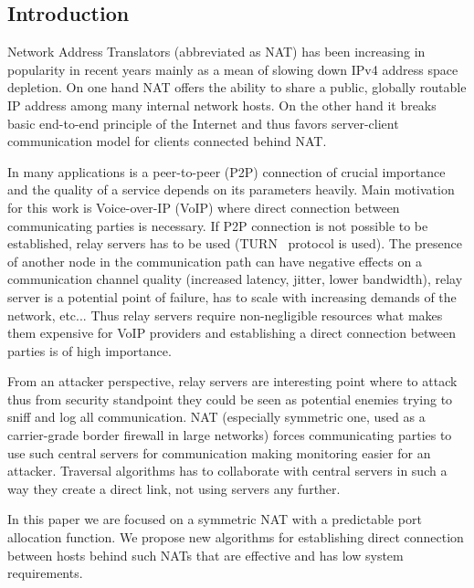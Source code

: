 \documentclass[twoside]{article}
\begin{document}
\begin{multicols}{2}

\section{Introduction}
Network Address Translators (abbreviated as NAT) has been increasing in popularity in recent years 
mainly as a mean of slowing down IPv4 address space depletion. On one hand NAT offers
the ability to share a public, globally routable IP address among many internal network hosts. On 
the other hand it breaks basic end-to-end principle of the Internet and thus favors server-client 
communication model for clients connected behind NAT.

In many applications is a peer-to-peer (P2P) connection of crucial importance and the quality of a service depends on 
its parameters heavily. Main motivation for this work is Voice-over-IP (VoIP) where direct connection 
between communicating parties is necessary. If P2P connection is not possible to be established, relay 
servers has to be used (TURN~\citep{rfc5766} protocol is used). The presence 
of another node in the communication path can have negative effects on a communication channel quality 
(increased latency, jitter, lower bandwidth), relay server is a potential point of failure, 
has to scale with increasing demands of the network, etc...
Thus relay servers require non-negligible resources what makes them expensive for VoIP providers and
establishing a direct connection between parties is of high importance.

From an attacker perspective, relay servers are interesting point where to attack thus from security
standpoint they could be seen as potential enemies trying to sniff and log all 
communication. NAT (especially symmetric one, used as a carrier-grade border firewall in large networks)
forces communicating parties to use such central servers
for communication making monitoring easier for an attacker. Traversal algorithms has to collaborate 
with central servers in such a way they create a direct link, not using servers any further. 
% 

In this paper we are focused on a symmetric NAT with a predictable port allocation function. We propose 
new algorithms for establishing direct connection between hosts behind such NATs that are effective and 
has low system requirements.


\end{multicols}
\end{document}
